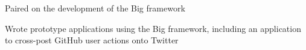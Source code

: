 \begin{job}

  \item Paired on the development of the Big framework
  \item Wrote prototype applications using the Big framework, including an application
  to cross-post GitHub user actions onto Twitter
\end{job}
